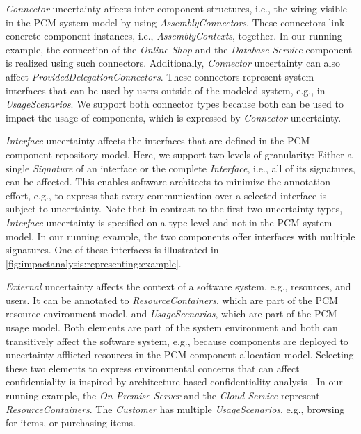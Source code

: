 \emph{Connector} uncertainty affects inter-component structures, i.e., the wiring visible in the \ac{PCM} system model by using \emph{AssemblyConnectors}.
These connectors link concrete component instances, i.e., \emph{AssemblyContexts}, together.
In our running example, the connection of the \emph{Online Shop} and the \emph{Database Service} component is realized using such connectors.
Additionally, \emph{Connector} uncertainty can also affect \emph{ProvidedDelegationConnectors}.
These connectors represent system interfaces that can be used by users outside of the modeled system, e.g., in \emph{UsageScenarios}.
We support both connector types because both can be used to impact the usage of components, which is expressed by \emph{Connector} uncertainty.

\emph{Interface} uncertainty affects the interfaces that are defined in the \ac{PCM} component repository model.
Here, we support two levels of granularity: Either a single \emph{Signature} of an interface or the complete \emph{Interface}, i.e., all of its signatures, can be affected.
This enables software architects to minimize the annotation effort, e.g., to express that every communication over a selected interface is subject to uncertainty.
Note that in contrast to the first two uncertainty types, \emph{Interface} uncertainty is specified on a type level and not in the \ac{PCM} system model.
In our running example, the two components offer interfaces with multiple signatures.
One of these interfaces is illustrated in \autoref{fig:impactanalysis:representing:example}.

\emph{External} uncertainty affects the context of a software system, e.g., resources, and users.
It can be annotated to \emph{ResourceContainers}, which are part of the \ac{PCM} resource environment model, and \emph{UsageScenarios}, which are part of the \ac{PCM} usage model.
Both elements are part of the system environment and both can transitively affect the software system, e.g., because components are deployed to uncertainty-afflicted resources in the \ac{PCM} component allocation model.
Selecting these two elements to express environmental concerns that can affect confidentiality is inspired by architecture-based confidentiality analysis \cite{seifermann_data-driven_2019}.
In our running example, the \emph{On Premise Server} and the \emph{Cloud Service} represent \emph{ResourceContainers}.
The \emph{Customer} has multiple \emph{UsageScenarios}, e.g., browsing for items, or purchasing items.

